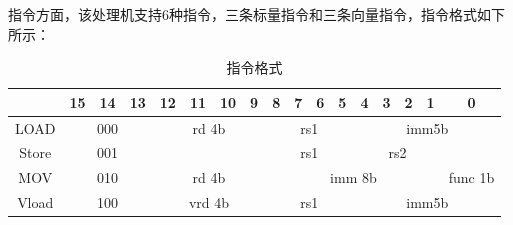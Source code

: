\documentclass{article}
\begin{document}
    指令方面，该处理机支持6种指令，三条标量指令和三条向量指令，指令格式如下所示：
    \begin{table}[!ht]
    \centering
    \caption{指令格式}
    \begin{tabular}{|c|ccc|cccc|ccccccccc|}
    \hline
    \multicolumn{1}{|l|}{}         & \multicolumn{1}{c|}{15} & \multicolumn{1}{c|}{14} & 13 & \multicolumn{1}{c|}{12} & \multicolumn{1}{c|}{11} & \multicolumn{1}{c|}{10} & 9 & \multicolumn{1}{c|}{8} & \multicolumn{1}{c|}{7} & \multicolumn{1}{c|}{6} & \multicolumn{1}{c|}{5} & \multicolumn{1}{c|}{4} & \multicolumn{1}{c|}{3} & \multicolumn{1}{c|}{2} & \multicolumn{1}{c|}{1} & 0                                             \\ \hline
    LOAD                           & \multicolumn{3}{c|}{000}                               & \multicolumn{4}{c|}{rd 4b}                                                      & \multicolumn{4}{c|}{rs1}                                                                          & \multicolumn{5}{c|}{imm5b}                                                                                                                        \\ \hline
    \cellcolor[HTML]{FFFFFF}Store  & \multicolumn{3}{c|}{001}                               & \multicolumn{4}{l|}{\cellcolor[HTML]{000000}}                                   & \multicolumn{4}{c|}{rs1}                                                                          & \multicolumn{4}{c|}{rs2}                                                                          & \multicolumn{1}{l|}{\cellcolor[HTML]{330001}} \\ \hline
    \cellcolor[HTML]{FFFFFF}MOV    & \multicolumn{3}{c|}{010}                               & \multicolumn{4}{c|}{rd 4b}                                                      & \multicolumn{8}{c|}{imm 8b}                                                                                                                                                                           & func 1b                                       \\ \hline
    \cellcolor[HTML]{FFFFFF}Vload  & \multicolumn{3}{c|}{100}                               & \multicolumn{4}{c|}{vrd 4b}                                                     & \multicolumn{4}{c|}{rs1}                                                                          & \multicolumn{5}{c|}{imm5b}                                                                                                                        \\ \hline

\end{tabular}
\end{table}
\end{document}
